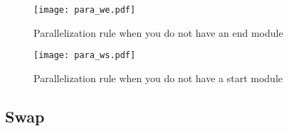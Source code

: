 \begin{figure}[h]
\centering
\texttt{[image: para\_we.pdf]}
\caption{Parallelization rule when you do not have an end module}
\label{fig:para_we}
\end{figure}

\begin{figure}[h]
\centering
\texttt{[image: para\_ws.pdf]}
\caption{Parallelization rule when you do not have a start module}
\label{fig:para_ws}
\end{figure}




\subsection{Swap}

